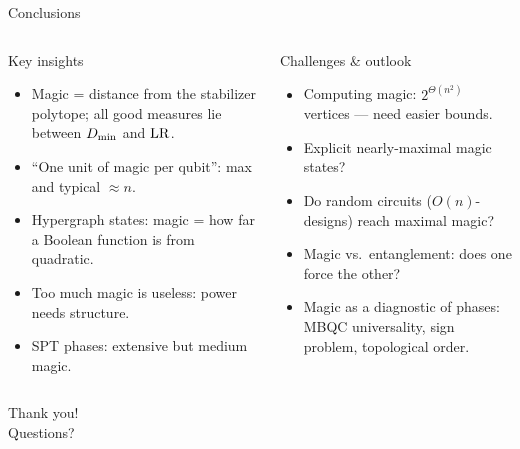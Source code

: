 \begin{frame}{Conclusions}
  \small
  \begin{columns}[T]
    \begin{block}{Key insights}
      \begin{itemize}
        \item Magic = distance from the stabilizer polytope; all good measures lie between $D_{\min}$ and $\mathrm{LR}$.
        \item ``One unit of magic per qubit'': max and typical $\approx n$.
        \item Hypergraph states: magic = how far a Boolean function is from quadratic.
        \item Too much magic is useless: power needs structure.
        \item SPT phases: extensive but medium magic.
      \end{itemize}
    \end{block}
    \begin{alertblock}{Challenges \& outlook}
      \begin{itemize}
        \item Computing magic: $2^{\Theta(n^2)}$ vertices --- need easier bounds.
        \item Explicit nearly-maximal magic states?
        \item Do random circuits ($O(n)$-designs) reach maximal magic?
        \item Magic vs.\ entanglement: does one force the other?
        \item Magic as a diagnostic of phases: MBQC universality, sign problem, topological order.
      \end{itemize}
    \end{alertblock}
  \end{columns}
\end{frame}

\begin{frame}[standout]
  Thank you!\\[0.6em]
  \normalsize Questions?
\end{frame}
